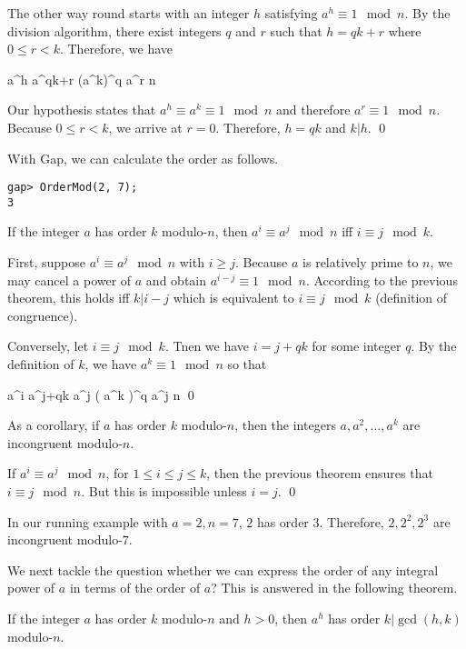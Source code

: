 The other way round starts with an integer $h$ satisfying $a^h \equiv 1 \mod n$. By the division algorithm, there exist integers $q$ and $r$ such that $h = qk+r$ where $0 \leq r < k$. Therefore, we have

\bee
a^h \equiv a^{qk+r} \equiv \left(a^k\right)^q a^r \mod n
\eee

Our hypothesis states that $a^h \equiv a^k \equiv 1 \mod n$ and therefore $a^r \equiv 1 \mod n$. Because $0 \leq r < k$, we arrive at $r=0$. Therefore, $h = qk$ and $k | h$. \qed

With Gap, we can calculate the order as follows.

\begin{verbatim}
gap> OrderMod(2, 7);
3
\end{verbatim}


\begin{theorem}
  \label{2021-03-02:th1}
  If the integer $a$ has order $k$ modulo-$n$, then $a^i \equiv a^j \mod n$ iff $i \equiv j \mod k$.
\end{theorem}

First, suppose $a^i \equiv a^j \mod n$ with $i \geq j$. Because $a$ is relatively prime to $n$, we may cancel a power of $a$ and obtain $a^{i-j} \equiv 1 \mod n$. According to the previous theorem, this holds iff $k | i-j$ which is equivalent to $i \equiv j \mod k$ (definition of congruence). 

Conversely, let $i \equiv j \mod k$. Tnen we have $i = j+  qk$ for some integer $q$. By the definition of $k$, we have $a^k \equiv 1 \mod n$ so that

\bee
a^i \equiv a^{j+qk} \equiv a^j \left( a^k \right)^q \equiv a^j \mod n \qed
\eee

As a corollary, if $a$ has order $k$ modulo-$n$, then the integers $a, a^2, \ldots, a^k$ are incongruent modulo-$n$.

If $a^i \equiv a^j \mod n$, for $1 \leq i \leq j \leq k$, then the previous theorem ensures that $i \equiv j \mod n$. But this is impossible unless $i=j$. \qed

In our running example with $a=2, n=7$, $2$ has order $3$. Therefore, $2, 2^2, 2^3$ are incongruent modulo-$7$.

We next tackle the question whether we can express the order of any integral power of $a$ in terms of the order of $a$? This is answered in the following theorem.

\begin{theorem}
  If the integer $a$ has order $k$ modulo-$n$ and $h > 0$, then $a^h$ has order $k | \gcd(h,k)$ modulo-$n$.
\end{theorem}

